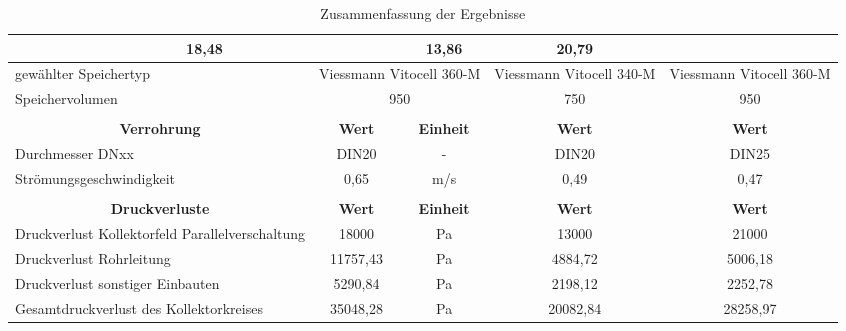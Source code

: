 \begin{table}[]
{\begin{tabular}{lcccc}
      \multicolumn{2}{c|}{18,48} &
      \multicolumn{1}{c|}{13,86} &
      \multicolumn{1}{c|}{\cellcolor[HTML]{26C324}20,79} \\ \hline
    \multicolumn{1}{|l|}{gewählter   Speichertyp} &
      \multicolumn{2}{c|}{Viessmann Vitocell 360-M} &
      \multicolumn{1}{c|}{Viessmann   Vitocell 340-M} &
      \multicolumn{1}{c|}{\cellcolor[HTML]{26C324}Viessmann   Vitocell 360-M} \\ \hline
    \multicolumn{1}{|l|}{Speichervolumen} &
      \multicolumn{2}{c|}{950} &
      \multicolumn{1}{c|}{750} &
      \multicolumn{1}{c|}{\cellcolor[HTML]{26C324}950} \\ \hline
     &
       &
       &
       &
      \cellcolor[HTML]{FFFFFF} \\ \cline{2-5} 
    \multicolumn{1}{c|}{\textbf{Verrohrung}} &
      \multicolumn{1}{c|}{\textbf{Wert}} &
      \multicolumn{1}{c|}{\textbf{Einheit}} &
      \multicolumn{1}{c|}{\textbf{Wert}} &
      \multicolumn{1}{c|}{\cellcolor[HTML]{26C324}\textbf{Wert}} \\ \hline
    \multicolumn{1}{|l|}{Durchmesser   DNxx} &
      \multicolumn{1}{c|}{DIN20} &
      \multicolumn{1}{c|}{-} &
      \multicolumn{1}{c|}{DIN20} &
      \multicolumn{1}{c|}{\cellcolor[HTML]{26C324}DIN25} \\ \hline
    \multicolumn{1}{|l|}{Strömungsgeschwindigkeit} &
      \multicolumn{1}{c|}{0,65} &
      \multicolumn{1}{c|}{m/s} &
      \multicolumn{1}{c|}{0,49} &
      \multicolumn{1}{c|}{\cellcolor[HTML]{26C324}0,47} \\ \hline
     &
       &
       &
       &
      \cellcolor[HTML]{FFFFFF} \\ \cline{2-5} 
    \multicolumn{1}{c|}{\textbf{Druckverluste}} &
      \multicolumn{1}{c|}{\textbf{Wert}} &
      \multicolumn{1}{c|}{\textbf{Einheit}} &
      \multicolumn{1}{c|}{\textbf{Wert}} &
      \multicolumn{1}{c|}{\cellcolor[HTML]{26C324}\textbf{Wert}} \\ \hline
    \multicolumn{1}{|l|}{Druckverlust Kollektorfeld Parallelverschaltung} &
      \multicolumn{1}{c|}{18000} &
      \multicolumn{1}{c|}{Pa} &
      \multicolumn{1}{c|}{13000} &
      \multicolumn{1}{c|}{\cellcolor[HTML]{26C324}21000} \\ \hline
    \multicolumn{1}{|l|}{Druckverlust   Rohrleitung} &
      \multicolumn{1}{c|}{11757,43} &
      \multicolumn{1}{c|}{Pa} &
      \multicolumn{1}{c|}{4884,72} &
      \multicolumn{1}{c|}{\cellcolor[HTML]{26C324}5006,18} \\ \hline
    \multicolumn{1}{|l|}{Druckverlust sonstiger Einbauten} &
      \multicolumn{1}{c|}{5290,84} &
      \multicolumn{1}{c|}{Pa} &
      \multicolumn{1}{c|}{2198,12} &
      \multicolumn{1}{c|}{\cellcolor[HTML]{26C324}2252,78} \\ \hline
    \multicolumn{1}{|l|}{Gesamtdruckverlust des Kollektorkreises} &
      \multicolumn{1}{c|}{35048,28} &
      \multicolumn{1}{c|}{Pa} &
      \multicolumn{1}{c|}{20082,84} &
      \multicolumn{1}{c|}{\cellcolor[HTML]{26C324}28258,97} \\ \hline
    \end{tabular}%
    }
    \caption{Zusammenfassung der Ergebnisse}
    \label{tab:Zusammenfassung}
    \end{table}